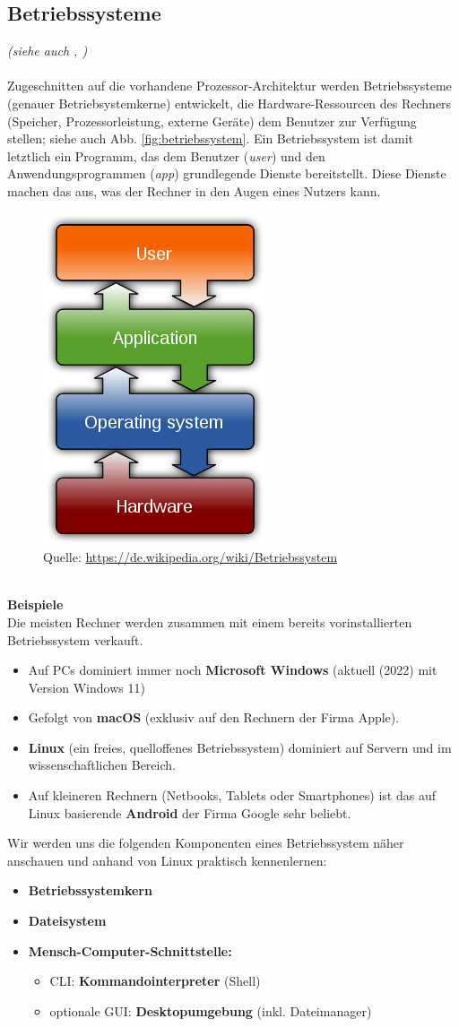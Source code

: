 \subsection{Betriebssysteme}
\textit{\small(siehe auch \cite[Kap. 2]{gumm2}, \cite[Kap. 6 ]{gumm3})}\\~\\
Zugeschnitten auf die vorhandene Prozessor-Architektur werden Betriebssysteme (genauer Betriebsystemkerne) entwickelt, die Hardware-Ressourcen des Rechners (Speicher, Prozessorleistung, externe Geräte) dem Benutzer zur Verfügung stellen; siehe auch Abb. \ref{fig:betriebssystem}.
Ein Betriebssystem ist damit letztlich ein Programm, das dem Benutzer (\textit{user}) und den Anwendungsprogrammen (\textit{app}) grundlegende Dienste bereitstellt. Diese Dienste  machen das aus, was der Rechner in den Augen eines Nutzers kann.\\
\begin{figure}[h!]
	\centering
	\includegraphics[width=0.2\linewidth]{./media/wiki_os}
	\caption{Quelle: \url{https://de.wikipedia.org/wiki/Betriebssystem}}
	\label{fig:wikios}
\end{figure}
~\\
\textbf{Beispiele}\\
Die meisten Rechner werden zusammen mit einem bereits vorinstallierten Betriebssystem verkauft.
\begin{itemize}
	\item Auf PCs dominiert immer noch \textbf{Microsoft Windows} (aktuell (2022) mit Version Windows 11)
	\item Gefolgt von \textbf{macOS} (exklusiv auf den Rechnern der Firma Apple).
	\item \textbf{Linux} (ein freies, quelloffenes Betriebssystem) dominiert auf Servern und im wissenschaftlichen Bereich.
	\item Auf kleineren Rechnern (Netbooks, Tablets oder Smartphones) ist das auf Linux basierende \textbf{Android} der Firma Google sehr beliebt.
\end{itemize}
Wir werden uns die folgenden Komponenten eines Betriebssystem näher anschauen und anhand von Linux praktisch kennenlernen:
\begin{itemize}
	\item \textbf{Betriebssystemkern}
	\item \textbf{Dateisystem}
	\item \textbf{Mensch-Computer-Schnittstelle:}
	\begin{itemize}
		\item CLI: \textbf{Kommandointerpreter} (Shell)
		\item optionale GUI: \textbf{Desktopumgebung} (inkl. Dateimanager)
	\end{itemize}
\end{itemize}

